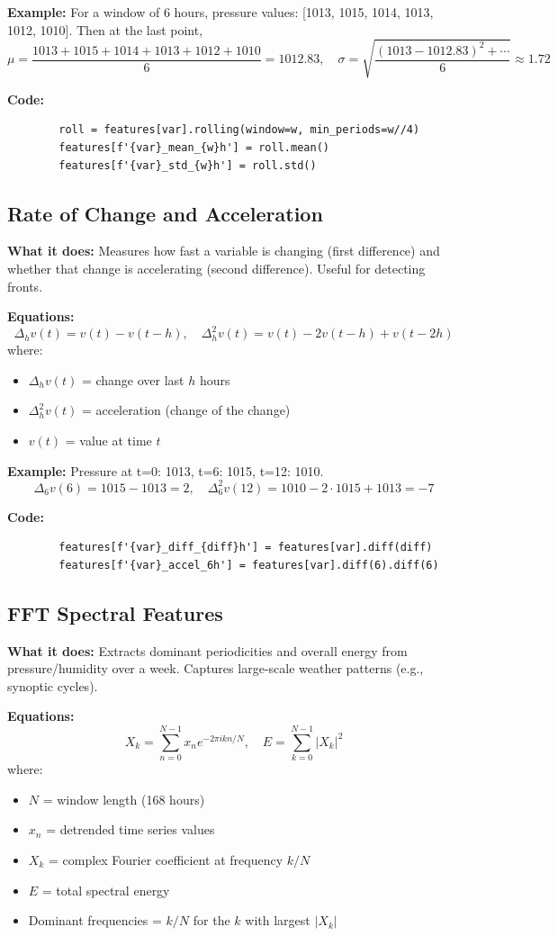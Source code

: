 \documentclass[12pt]{article}
\begin{document}
	\textbf{Example:} For a window of 6 hours, pressure values: [1013, 1015, 1014, 1013, 1012, 1010]. Then at the last point,
	\[
	\mu = \frac{1013+1015+1014+1013+1012+1010}{6} = 1012.83,\quad
	\sigma = \sqrt{\frac{(1013-1012.83)^2+\cdots}{6}} \approx 1.72
	\]
	
	\textbf{Code:}
	\begin{lstlisting}
		roll = features[var].rolling(window=w, min_periods=w//4)
		features[f'{var}_mean_{w}h'] = roll.mean()
		features[f'{var}_std_{w}h'] = roll.std()
	\end{lstlisting}
	
	\subsection*{Rate of Change and Acceleration}
	\textbf{What it does:} Measures how fast a variable is changing (first difference) and whether that change is accelerating (second difference). Useful for detecting fronts.
	
	\textbf{Equations:}
	\[
	\Delta_h v(t) = v(t)-v(t-h),\quad
	\Delta_h^2 v(t) = v(t)-2v(t-h)+v(t-2h)
	\]
	where:
	\begin{itemize}
		\item $\Delta_h v(t)$ = change over last $h$ hours
		\item $\Delta_h^2 v(t)$ = acceleration (change of the change)
		\item $v(t)$ = value at time $t$
	\end{itemize}
	
	\textbf{Example:} Pressure at t=0: 1013, t=6: 1015, t=12: 1010.
	\[
	\Delta_6 v(6) = 1015-1013 = 2,\quad
	\Delta_6^2 v(12) = 1010 - 2\cdot1015 + 1013 = -7
	\]
	
	\textbf{Code:}
	\begin{lstlisting}
		features[f'{var}_diff_{diff}h'] = features[var].diff(diff)
		features[f'{var}_accel_6h'] = features[var].diff(6).diff(6)
	\end{lstlisting}
	
	\subsection*{FFT Spectral Features}
	\textbf{What it does:} Extracts dominant periodicities and overall energy from pressure/humidity over a week. Captures large‑scale weather patterns (e.g., synoptic cycles).
	
	\textbf{Equations:}
	\[
	X_k = \sum_{n=0}^{N-1} x_n e^{-2\pi i k n/N},\quad
	E = \sum_{k=0}^{N-1} |X_k|^2
	\]
	where:
	\begin{itemize}
		\item $N$ = window length (168 hours)
		\item $x_n$ = detrended time series values
		\item $X_k$ = complex Fourier coefficient at frequency $k/N$
		\item $E$ = total spectral energy
		\item Dominant frequencies = $k/N$ for the $k$ with largest $|X_k|$
	\end{itemize}
	
\end{document}
